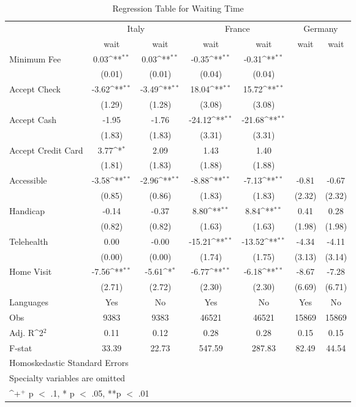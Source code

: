 \begin{table}[]
\caption{Regression Table for Waiting Time}
{
\def\sym#1{\ifmmode^{#1}\else\(^{#1}\)\fi}
\begin{tabular}{@{\extracolsep{2pt}}l*{6}{c}@{}}
\hline\hline
& \multicolumn{2}{c}{Italy} & \multicolumn{2}{c}{France} & \multicolumn{2}{c}{Germany} \\
\cline{2-3}
\cline{4-5}
\cline{6-7}
 & wait & wait & wait & wait & wait & wait \\
\hline
Minimum Fee & 0.03\sym{**} & 0.03\sym{**} & -0.35\sym{**} & -0.31\sym{**} &  &  \\
 & (0.01) & (0.01) & (0.04) & (0.04) &  &  \\
Accept Check & -3.62\sym{**} & -3.49\sym{**} & 18.04\sym{**} & 15.72\sym{**} &  &  \\
 & (1.29) & (1.28) & (3.08) & (3.08) &  &  \\
Accept Cash & -1.95 & -1.76 & -24.12\sym{**} & -21.68\sym{**} &  &  \\
 & (1.83) & (1.83) & (3.31) & (3.31) &  &  \\
Accept Credit Card & 3.77\sym{*} & 2.09 & 1.43 & 1.40 &  &  \\
 & (1.81) & (1.83) & (1.88) & (1.88) &  &  \\
Accessible & -3.58\sym{**} & -2.96\sym{**} & -8.88\sym{**} & -7.13\sym{**} & -0.81 & -0.67 \\
 & (0.85) & (0.86) & (1.83) & (1.83) & (2.32) & (2.32) \\
Handicap & -0.14 & -0.37 & 8.80\sym{**} & 8.84\sym{**} & 0.41 & 0.28 \\
 & (0.82) & (0.82) & (1.63) & (1.63) & (1.98) & (1.98) \\
Telehealth & 0.00 & -0.00 & -15.21\sym{**} & -13.52\sym{**} & -4.34 & -4.11 \\
 & (0.00) & (0.00) & (1.74) & (1.75) & (3.13) & (3.14) \\
Home Visit & -7.56\sym{**} & -5.61\sym{*} & -6.77\sym{**} & -6.18\sym{**} & -8.67 & -7.28 \\
 & (2.71) & (2.72) & (2.30) & (2.30) & (6.69) & (6.71) \\
Languages & Yes & No & Yes & No & Yes & No \\

\hline
Obs & 9383 & 9383 & 46521 & 46521 & 15869 & 15869 \\
Adj. R\sym{2} & 0.11 & 0.12 & 0.28 & 0.28 & 0.15 & 0.15 \\
F-stat & 33.39 & 22.73 & 547.59 & 287.83 & 82.49 & 44.54 \\
\hline\hline
\multicolumn{7}{l}{\footnotesize Homoskedastic Standard Errors}\vspace{-.25em} \\
\multicolumn{7}{l}{\footnotesize Specialty variables are omitted}\vspace{-.25em} \\
\multicolumn{7}{l}{\footnotesize \sym{+} p $<$ .1, * p $<$ .05, **p $<$ .01}
\end{tabular}
}
\end{table}